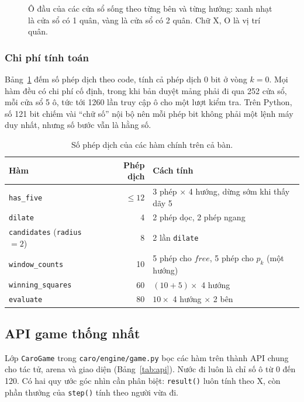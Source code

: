 \begin{figure}[H]
  \centering
  
  \caption{Ô đầu của các cửa sổ sống theo từng bên và từng hướng: xanh nhạt là cửa sổ có 1 quân, vàng là cửa sổ có 2 quân. Chữ X, O là vị trí quân.}
  \label{fig:danh-gia}
\end{figure}

\begin{table}[H]
  \centering\small
  \caption{Số cửa sổ sống và điểm của từng bên trong ví dụ, $n_k$ là số cửa sổ có đúng $k$ quân.}
  \label{tab:danh-gia}
  
\end{table}

\subsubsection{Chi phí tính toán}
Bảng~\ref{tab:chi-phi} đếm số phép dịch theo code, tính cả phép dịch 0 bit ở vòng $k = 0$. Mọi hàm đều có chi phí cố định, trong khi bản duyệt mảng phải đi qua 252 cửa sổ, mỗi cửa sổ 5 ô, tức tới \num{1260} lần truy cập ô cho một lượt kiểm tra. Trên Python, số 121 bit chiếm vài ``chữ số'' nội bộ nên mỗi phép bit không phải một lệnh máy duy nhất, nhưng số bước vẫn là hằng số.

\begin{table}[H]
  \centering\small
  \caption{Số phép dịch của các hàm chính trên cả bàn.}
  \label{tab:chi-phi}
  \begin{tabular}{@{}lrl@{}}
    \toprule
    \textbf{Hàm} & \textbf{Phép dịch} & \textbf{Cách tính} \\
    \midrule
    \texttt{has\_five} & $\le 12$ & 3 phép $\times$ 4 hướng, dừng sớm khi thấy dãy 5 \\
    \texttt{dilate} & 4 & 2 phép dọc, 2 phép ngang \\
    \texttt{candidates} (\texttt{radius} $= 2$) & 8 & 2 lần \texttt{dilate} \\
    \texttt{window\_counts} & 10 & 5 phép cho $\mathit{free}$, 5 phép cho $p_k$ (một hướng) \\
    \texttt{winning\_squares} & 60 & $(10 + 5) \times$ 4 hướng \\
    \texttt{evaluate} & 80 & $10 \times$ 4 hướng $\times$ 2 bên \\
    \bottomrule
  \end{tabular}
\end{table}

\subsection{API game thống nhất}
\label{sec:bb-api}
Lớp \texttt{CaroGame} trong \texttt{caro/engine/game.py} bọc các hàm trên thành API chung cho tác tử, arena và giao diện (Bảng~\ref{tab:api}). Nước đi luôn là chỉ số ô từ 0 đến 120. Có hai quy ước góc nhìn cần phân biệt: \texttt{result()} luôn tính theo X, còn phần thưởng của \texttt{step()} tính theo người vừa đi.

